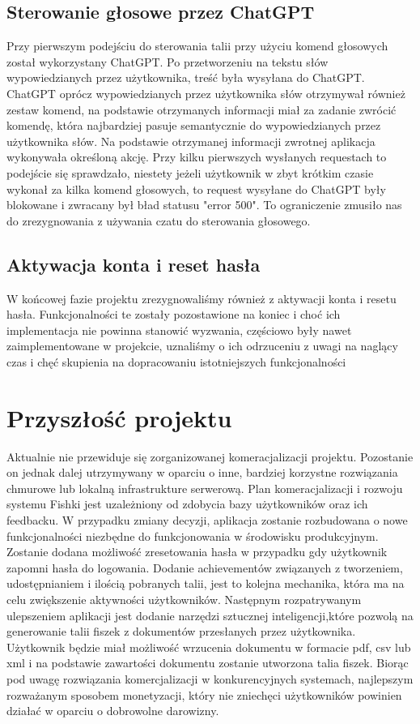 \subsection{Sterowanie głosowe przez ChatGPT}
Przy pierwszym podejściu do sterowania talii przy użyciu komend głosowych został wykorzystany ChatGPT. Po przetworzeniu na tekstu słów wypowiedzianych przez użytkownika, treść była wysyłana do ChatGPT. ChatGPT oprócz wypowiedzianych przez użytkownika słów otrzymywał również zestaw komend, na podstawie otrzymanych informacji miał za zadanie zwrócić komendę, która najbardziej pasuje semantycznie do wypowiedzianych przez użytkownika słów. Na podstawie otrzymanej informacji zwrotnej aplikacja wykonywała określoną akcję. Przy kilku pierwszych wysłanych requestach to podejście się sprawdzało, niestety jeżeli użytkownik w zbyt krótkim czasie wykonał za kilka komend głosowych, to request wysyłane do ChatGPT były blokowane i zwracany był bład statusu "error 500". To ograniczenie zmusiło nas do zrezygnowania z używania czatu do sterowania głosowego.

\subsection{Aktywacja konta i reset hasła}
W końcowej fazie projektu zrezygnowaliśmy również z aktywacji konta i resetu hasła. Funkcjonalności te zostały pozostawione na koniec i choć ich implementacja nie powinna stanowić wyzwania, częściowo były nawet zaimplementowane w projekcie,  uznaliśmy o ich odrzuceniu z uwagi na naglący czas i chęć skupienia na dopracowaniu istotniejszych funkcjonalności


\section{Przyszłość projektu}
Aktualnie nie przewiduje się zorganizowanej komeracjalizacji projektu. Pozostanie on jednak dalej utrzymywany w oparciu o inne, bardziej korzystne rozwiązania chmurowe lub lokalną infrastrukture serwerową. Plan komeracjalizacji i rozwoju systemu Fishki jest uzależniony od zdobycia bazy użytkowników oraz ich feedbacku. W przypadku zmiany decyzji, aplikacja zostanie rozbudowana o nowe funkcjonalności niezbędne do funkcjonowania w środowisku produkcyjnym. Zostanie dodana możliwość zresetowania hasła w przypadku gdy użytkownik zapomni hasła do logowania. Dodanie achievementów związanych z tworzeniem, udostępnianiem i ilością pobranych talii, jest to kolejna mechanika, która ma na celu zwiększenie aktywności użytkowników. Następnym rozpatrywanym ulepszeniem aplikacji jest dodanie narzędzi sztucznej inteligencji,które pozwolą na generowanie talii fiszek z dokumentów przesłanych przez użytkownika. Użytkownik będzie miał możliwość wrzucenia dokumentu w formacie pdf, csv lub xml i na podstawie zawartości dokumentu zostanie utworzona talia fiszek. Biorąc pod uwagę rozwiązania komercjalizacji w konkurencyjnych systemach, najlepszym rozważanym sposobem monetyzacji, który nie zniechęci użytkowników powinien działać w oparciu o dobrowolne darowizny.


